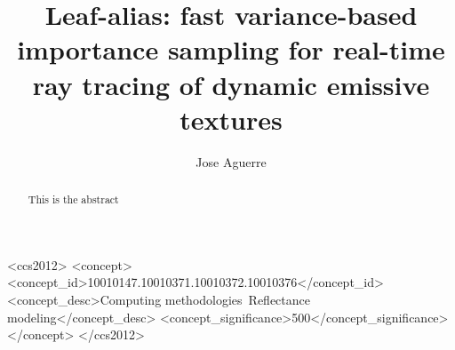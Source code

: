 \documentclass[sigconf]{acmart}
\begin{document}
\title{Leaf-alias: fast variance-based importance sampling for real-time ray tracing of dynamic emissive textures}


\author{Jose Aguerre}

\graphicspath{{images/}}
\newcommand{\FLIP}{\protect\reflectbox{F}LIP\xspace}
\begin{abstract}
This is the abstract
\end{abstract}

\begin{CCSXML}
<ccs2012>
   <concept>
       <concept_id>10010147.10010371.10010372.10010376</concept_id>
       <concept_desc>Computing methodologies~Reflectance modeling</concept_desc>
       <concept_significance>500</concept_significance>
       </concept>
 </ccs2012>
\end{CCSXML}


\end{document}
